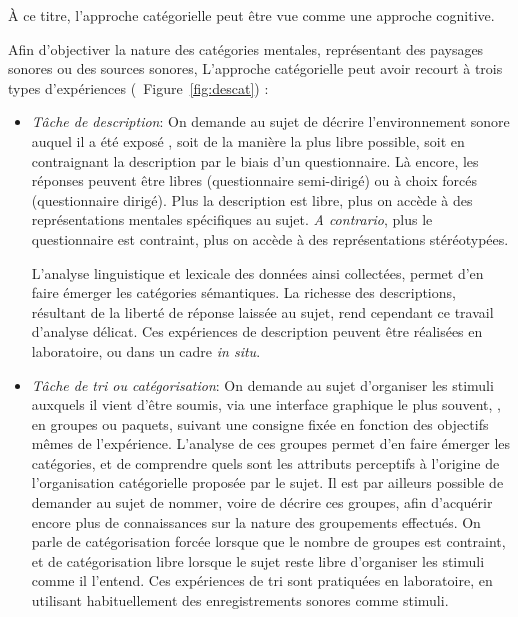 À ce titre, l'approche catégorielle peut être vue comme une approche cognitive. 

Afin d'objectiver la nature des catégories mentales, représentant des paysages sonores ou des sources sonores, L'approche catégorielle peut avoir recourt à trois types d'expériences (\cf~Figure~\ref{fig:descat}) :

\begin{itemize}
\item \emph{Tâche de description}: On demande au sujet de décrire l'environnement sonore auquel il a été exposé \citep{axelsson2005soundscape,raimbault2005urban,guastavino2006ideal,raimbault2006qualitative}, soit de la manière la plus libre possible, soit en contraignant la description par le biais d'un questionnaire. Là encore, les réponses peuvent être libres (questionnaire semi-dirigé) ou à choix forcés (questionnaire dirigé). Plus la description est libre, plus on accède à des représentations mentales spécifiques au sujet. \emph{A contrario}, plus le questionnaire est contraint, plus on accède à des représentations stéréotypées. 

L'analyse linguistique et lexicale des données ainsi collectées, permet d'en faire émerger les catégories sémantiques. La richesse des descriptions, résultant de la liberté de réponse laissée au sujet, rend cependant ce travail d'analyse délicat. Ces expériences de description peuvent être réalisées en laboratoire, ou dans un cadre \emph{in situ}.

\item \emph{Tâche de tri ou catégorisation}: On demande au sujet d'organiser les stimuli auxquels il vient d'être soumis, via une interface graphique le plus souvent, \citep{maffiolo_caracterisation_1999,guastavino2007categorization}, en groupes ou paquets, suivant une consigne fixée en fonction des objectifs mêmes de l'expérience. L'analyse de ces groupes permet d'en faire émerger les catégories, et de comprendre quels sont les attributs perceptifs à l'origine de l'organisation catégorielle proposée par le sujet. Il est par ailleurs possible de demander au sujet de nommer, voire de décrire ces groupes, afin d'acquérir encore plus de connaissances sur la nature des groupements effectués. On parle de catégorisation forcée lorsque que le nombre de groupes est contraint, et de catégorisation libre lorsque le sujet reste libre d'organiser les stimuli comme il l'entend. Ces expériences de tri sont pratiquées en laboratoire, en utilisant habituellement des enregistrements sonores comme stimuli.


\end{itemize}

